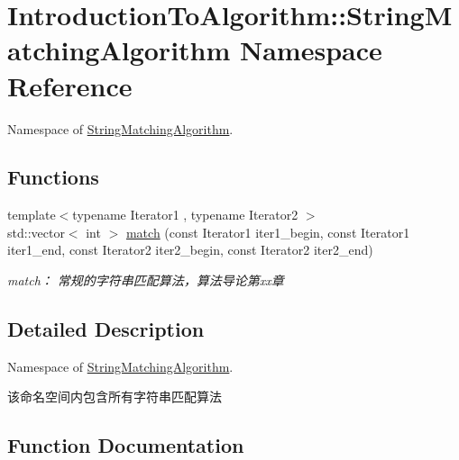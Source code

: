 \hypertarget{namespace_introduction_to_algorithm_1_1_string_matching_algorithm}{}\section{Introduction\+To\+Algorithm\+:\+:String\+Matching\+Algorithm Namespace Reference}
\label{namespace_introduction_to_algorithm_1_1_string_matching_algorithm}


Namespace of \hyperlink{namespace_introduction_to_algorithm_1_1_string_matching_algorithm}{String\+Matching\+Algorithm}.  


\subsection*{Functions}
\begin{DoxyCompactItemize}
\item 
{\footnotesize template$<$typename Iterator1 , typename Iterator2 $>$ }\\std\+::vector$<$ int $>$ \hyperlink{namespace_introduction_to_algorithm_1_1_string_matching_algorithm_abd6d1a2ecf0964999ca1a7c0cd8eaaa3}{match} (const Iterator1 iter1\+\_\+begin, const Iterator1 iter1\+\_\+end, const Iterator2 iter2\+\_\+begin, const Iterator2 iter2\+\_\+end)
\begin{DoxyCompactList}\small\item\em match： 常规的字符串匹配算法，算法导论第xx章 \end{DoxyCompactList}\end{DoxyCompactItemize}


\subsection{Detailed Description}
Namespace of \hyperlink{namespace_introduction_to_algorithm_1_1_string_matching_algorithm}{String\+Matching\+Algorithm}. 

该命名空间内包含所有字符串匹配算法 

\subsection{Function Documentation}
\hypertarget{namespace_introduction_to_algorithm_1_1_string_matching_algorithm_abd6d1a2ecf0964999ca1a7c0cd8eaaa3}{}
